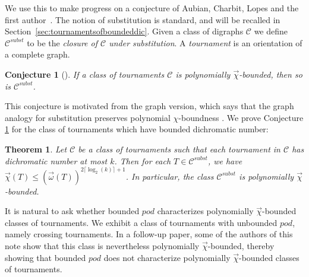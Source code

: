 \documentclass{article}
\newcommand{\dic}{\vec\chi}
\newcommand{\diomega}{\vec\omega}
\renewcommand{\le}{\leqslant}
\newtheorem{theorem}[lemma]{Theorem}
\newtheorem{conj}[lemma]{Conjecture}
\begin{document}
We use this to make progress on a conjecture of Aubian, Charbit, Lopes and the first author~\cite{original}. The notion of substitution is standard, and will be recalled in Section~\ref{sec:tournamentsofboundeddic}. 
Given a class of digraphs $\mathcal{C}$ we define $\mathcal{C}^{subst}$ to be the \textit{closure of $\mathcal{C}$ under substitution}. 
A \emph{tournament} is an orientation of a complete graph. %

\begin{conj}[\cite{original}]
\label{conj:substitution}
If a class of tournaments $\mathcal{C}$
is polynomially $\dic$-bounded, then so is $\mathcal{C}^{subst}$.
\end{conj}

This conjecture is motivated from the graph version, which says that the graph analogy for substitution preserves polynomial $\chi$-boundness \cite{substitution}.
We prove Conjecture \ref{conj:substitution} for the class of tournaments which have bounded dichromatic number:
\begin{theorem}
\label{thm:boundeddichromatic}
Let $\mathcal{C}$ be a class of tournaments such that each tournament in $\mathcal{C}$ has dichromatic number at most $k$. Then for each $T \in \mathcal{C}^{subst}$, we have  $\dic(T) \leq (\diomega(T))^{2\lceil \log_2(k) \rceil +1}$. In particular, the class $\mathcal{C}^{subst}$ is polynomially $\dic$-bounded. 
\end{theorem}


It is natural to ask  whether bounded $pod$ characterizes polynomially $\dic$-bounded classes of  tournaments. 
We  exhibit a class of tournaments with unbounded $pod$, namely crossing tournaments. In a follow-up paper, some of the authors of this note show that this class is nevertheless polynomially $\dic$-bounded, thereby showing that bounded $pod$ does not characterize polynomially $\dic$-bounded classes of tournaments. 


\end{document}
